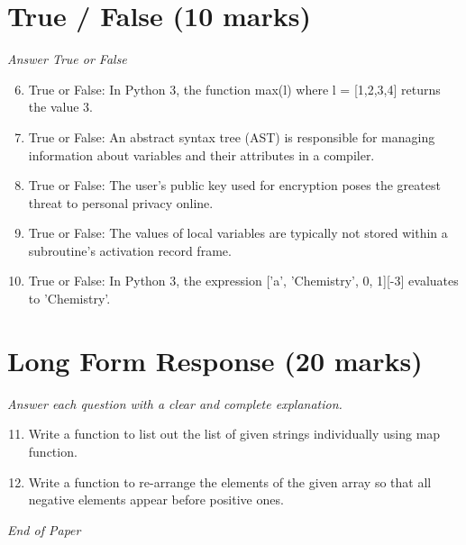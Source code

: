 \documentclass[12pt]{article}
\begin{document}
\section*{True / False (10 marks)}
\textit{Answer True or False}
\begin{enumerate}[label=\arabic*.]
\setcounter{enumi}{5}
\item True or False: In Python 3, the function max(l) where l = [1,2,3,4] returns the value 3.
\item True or False: An abstract syntax tree (AST) is responsible for managing information about variables and their attributes in a compiler.
\item True or False: The user's public key used for encryption poses the greatest threat to personal privacy online.
\item True or False: The values of local variables are typically not stored within a subroutine's activation record frame.
\item True or False: In Python 3, the expression ['a', 'Chemistry', 0, 1][-3] evaluates to 'Chemistry'.
\end{enumerate}

\section*{Long Form Response (20 marks)}
\textit{Answer each question with a clear and complete explanation.}
\begin{enumerate}[label=\arabic*.]
\setcounter{enumi}{10}
\item Write a function to list out the list of given strings individually using map function.
\item Write a function to re-arrange the elements of the given array so that all negative elements appear before positive ones.
\end{enumerate}

\vfill
\noindent\textit{End of Paper}
\end{document}
